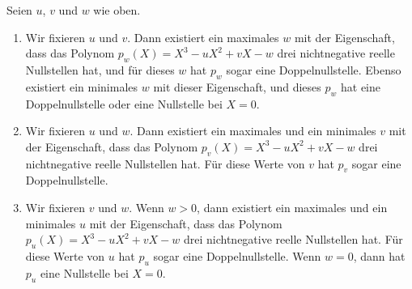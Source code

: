 \begin{satzmitnamen}
	Seien $u$, $v$ und $w$ wie oben.
	\begin{enumerate}[label={$(\alph*)$},ref={$(\alph*)$}]
		\item Wir fixieren $u$ und $v$. Dann existiert ein maximales $w$ mit der Eigenschaft, dass das Polynom $p_w(X)=X^3-uX^2+vX-w$ drei nichtnegative reelle Nullstellen hat, und für dieses $w$ hat $p_w$ sogar eine Doppelnullstelle. Ebenso existiert ein minimales $w$ mit dieser Eigenschaft, und dieses $p_w$ hat eine Doppelnullstelle oder eine Nullstelle bei $X=0$.\label{behauptung:uv}
		\item Wir fixieren $u$ und $w$. Dann existiert ein maximales und ein minimales $v$ mit der Eigenschaft, dass das Polynom $p_v(X)=X^3-uX^2+vX-w$ drei nichtnegative reelle Nullstellen hat. Für diese Werte von $v$ hat $p_v$ sogar eine Doppelnullstelle.\label{behauptung:uw}
		\item Wir fixieren $v$ und $w$. Wenn $w>0$, dann existiert ein maximales und ein minimales $u$ mit der Eigenschaft, dass das Polynom $p_u(X)=X^3-uX^2+vX-w$ drei nichtnegative reelle Nullstellen hat. Für diese Werte von $u$ hat $p_u$ sogar eine Doppelnullstelle. Wenn $w=0$, dann hat $p_u$ eine Nullstelle bei $X=0$.\label{behauptung:vw}
	\end{enumerate}
\end{satzmitnamen}
